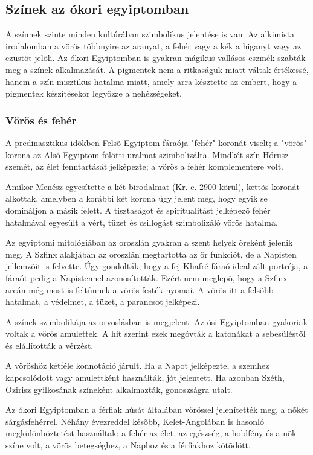 	\subsection{Színek az ókori egyiptomban}
	
	A színnek szinte minden kultúrában szimbolikus jelentése is van. Az alkimista irodalomban a vörös többnyire az aranyat, a fehér vagy a kék a higanyt vagy az ezüstöt jelöli. Az ókori Egyiptomban is gyakran mágikus-vallásos eszmék szabták meg a színek alkalmazását. A pigmentek nem a ritkaságuk miatt váltak értékessé, hanem a szín misztikus hatalma miatt, amely arra késztette az embert, hogy a pigmentek készítésekor legyõzze a nehézségeket.
	
	\subsubsection{Vörös és fehér}
	A predinasztikus idõkben Felsõ-Egyiptom fáraója "fehér" koronát viselt; a "vörös" korona az Alsó-Egyiptom fölötti uralmat szimbolizálta. Mindkét szín Hórusz szemét, az élet fenntartását jelképezte; a vörös a fehér komplementere volt.
	
	Amikor Menész egyesítette a két birodalmat (Kr. e. 2900 körül), kettõs koronát alkottak, amelyben a korábbi két korona úgy jelent meg, hogy egyik se domináljon a másik felett. A tisztaságot és spiritualitást jelképezõ fehér hatalmával egyesült a vért, tüzet és csillogást szimbolizáló vörös hatalma.
	
	Az egyiptomi mitológiában az oroszlán gyakran a szent helyek õreként jelenik meg. A Szfinx alakjában az oroszlán megtartotta az õr funkciót, de a Napisten jellemzõit is felvette. Úgy gondolták, hogy a fej Khafré fáraó idealizált portréja, a fáraót pedig a Napistennel azonosították. Ezért nem meglepõ, hogy a Szfinx arcán még most is feltûnnek a vörös festék nyomai. A vörös itt a felsõbb hatalmat, a védelmet, a tüzet, a parancsot jelképezi.
	
	A színek szimbolikája az orvoslásban is megjelent. Az õsi Egyiptomban gyakoriak voltak a vörös amulettek. A hit szerint ezek megóvták a katonákat a sebesüléstõl és elállították a vérzést.
	
	A vöröshöz kétféle konnotáció járult. Ha a Napot jelképezte, a szemhez kapcsolódott vagy amulettként használták, jót jelentett. Ha azonban Széth, Ozirisz gyilkosának színeként alkalmazták, gonoszságra utalt.
	
	Az ókori Egyiptomban a férfiak húsát általában vörössel jelenítették meg, a nõkét sárgásfehérrel. Néhány évezreddel késõbb, Kelet-Angolában is hasonló megkülönböztetést használtak: a fehér az élet, az egészség, a holdfény és a nõk színe volt, a vörös betegséghez, a Naphoz és a férfiakhoz kötõdött.
	
